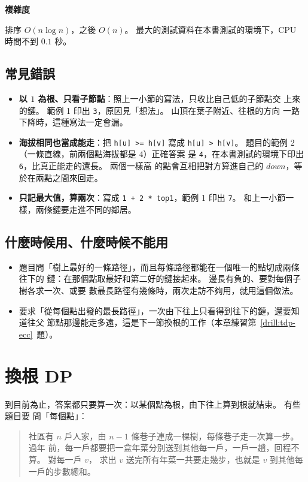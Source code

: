 \textbf{複雜度}

排序 $O(n \log n)$，之後 $O(n)$。 最大的測試資料在本書測試的環境下，CPU 時間不到
$0.1$ 秒。

\subsection{常見錯誤}

\begin{itemize}
\item \textbf{以 $1$ 為根、只看子節點}：照上一小節的寫法，只收比自己低的子節點交
上來的鏈。 範例 1 印出 \texttt{3}，原因見「想法」。 山頂在葉子附近、往根的方向
一路下降時，這種寫法一定會漏。
\item \textbf{海拔相同也當成能走}：把 \texttt{h[u] >= h[v]} 寫成
\texttt{h[u] > h[v]}。 題目的範例 2（一條直線，前兩個點海拔都是 $4$）正確答案
是 \texttt{4}，在本書測試的環境下印出 \texttt{6}，比真正能走的還長。 兩個一樣高
的點會互相把對方算進自己的 $\mathit{down}$，等於在兩點之間來回走。
\item \textbf{只記最大值，算兩次}：寫成 \texttt{1 + 2 * top1}，範例 1 印出
\texttt{7}。 和上一小節一樣，兩條鏈要走進不同的鄰居。
\end{itemize}

\subsection{什麼時候用、什麼時候不能用}

\begin{itemize}
\item 題目問「樹上最好的一條路徑」，而且每條路徑都能在一個唯一的點切成兩條往下的
鏈：在那個點取最好和第二好的鏈接起來。 邊長有負的、要對每個子樹各求一次、或要
數最長路徑有幾條時，兩次走訪不夠用，就用這個做法。
\item 要求「從每個點出發的最長路徑」，一次由下往上只看得到往下的鏈，還要知道往父
節點那邊能走多遠，這是下一節換根的工作（本章練習第~\ref{drill:tdp-ecc}~題）。
\end{itemize}

\section{換根 DP}
\label{sec:tdp-reroot}

到目前為止，答案都只要算一次：以某個點為根，由下往上算到根就結束。 有些題目要
問「每個點」：

\begin{quote}
社區有 $n$ 戶人家，由 $n - 1$ 條巷子連成一棵樹，每條巷子走一次算一步。 過年
前，每一戶都要把一盒年菜分別送到其他每一戶，一戶一趟，回程不算。 對每一戶 $v$，
求出 $v$ 送完所有年菜一共要走幾步，也就是 $v$ 到其他每一戶的步數總和。
\end{quote}

